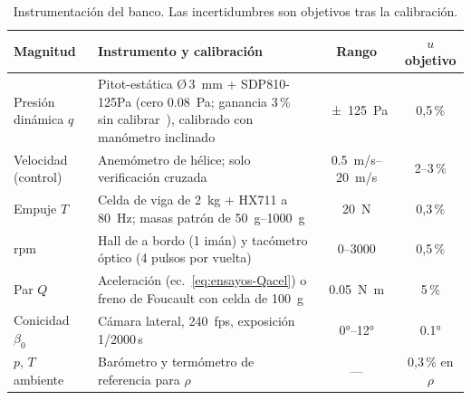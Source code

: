 \begin{table}[H]
\centering\small
\caption{Instrumentación del banco. Las incertidumbres son objetivos tras la calibración.}
\label{tab:ensayos-instr}
\begin{tabularx}{\textwidth}{@{}lYcc@{}}
\toprule
\textbf{Magnitud} & \textbf{Instrumento y calibración} & \textbf{Rango} & \textbf{$u$ objetivo}\\\midrule
Presión dinámica $q$ & Pitot-estática Ø\,\SI{3}{mm} + SDP810-125Pa (cero \SI{0.08}{Pa}; ganancia 3\,\% sin calibrar~\cite{ensayos-sdp810}), calibrado con manómetro inclinado & \SI{\pm125}{Pa} & 0,5\,\%\\
Velocidad (control) & Anemómetro de hélice; solo verificación cruzada & \SIrange{0.5}{20}{m/s} & 2--3\,\%\\
Empuje $T$ & Celda de viga de \SI{2}{kg} + HX711 a \SI{80}{Hz}; masas patrón de \SIrange{50}{1000}{g} & \SI{20}{N} & 0,3\,\%\\
rpm & Hall de a bordo (1 imán) y tacómetro óptico (4 pulsos por vuelta) & \num{0}--\num{3000} & 0,5\,\%\\
Par $Q$ & Aceleración (ec.~\ref{eq:ensayos-Qacel}) o freno de Foucault con celda de \SI{100}{g} & \SI{0.05}{N.m} & 5\,\%\\
Conicidad $\beta_0$ & Cámara lateral, \SI{240}{fps}, exposición 1/2000\,s & \ang{0}--\ang{12} & \ang{0.1}\\
$p$, $T$ ambiente & Barómetro y termómetro de referencia para $\rho$ & --- & 0,3\,\% en $\rho$\\
\bottomrule
\end{tabularx}
\end{table}

